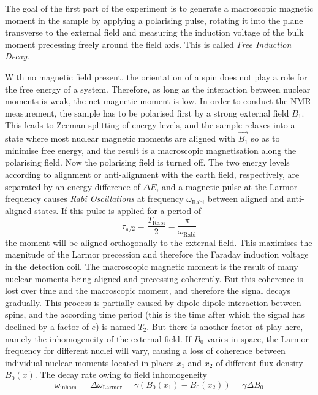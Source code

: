 \documentclass[
    parskip=half, 
    twoside=false,
    twocolumn=true,
    fontsize=11pt,
]{scrarticle}
\begin{document}
The goal of the first part of the experiment is to generate a macroscopic magnetic moment in the sample by applying a polarising pulse, rotating it into the plane transverse to the external field and measuring the induction voltage of the bulk moment precessing freely around the field axis. This is called \textit{Free Induction Decay}.

With no magnetic field present, the orientation of a spin does not play a role for the free energy of a system. Therefore, as long as the interaction between nuclear moments is weak, the net magnetic moment is low. In order to conduct the NMR measurement, the sample has to be polarised first by a strong external field $B_1$. This leads to Zeeman splitting of energy levels, and the sample relaxes into a state where most nuclear magnetic moments are aligned with $\vec{B_1}$ so as to minimise free energy, and the result is a macroscopic magnetisation along the polarising field. Now the polarising field is turned off. The two energy levels according to alignment or anti-alignment with the earth field, respectively, are separated by an energy difference of $\Delta E$, and a magnetic pulse at the Larmor frequency causes \textit{Rabi Oscillations} at frequency $\omega_\text{Rabi}$ between aligned and anti-aligned states. If this pulse is applied for a period of
\begin{equation}
 \tau_{\pi/2} = \frac{T_\text{Rabi}}{2} = \frac{\pi}{\omega_\text{Rabi}}
\end{equation}
the moment will be aligned orthogonally to the external field. This maximises the magnitude of the Larmor precession and therefore the Faraday induction voltage in the detection coil. The macroscopic magnetic moment is the result of many nuclear moments being aligned and precessing coherently. But this coherence is lost over time and the macroscopic moment, and therefore the signal decays gradually. This process is partially caused by dipole-dipole interaction between spins, and the according time period (this is the time after which the signal has declined by a factor of $e$) is named $T_2$. But there is another factor at play here, namely the inhomogeneity of the external field. If $B_0$ varies in space, the Larmor frequency for different nuclei will vary, causing a loss of coherence between individual nuclear moments located in places $x_1$ and $x_2$ of different flux density $B_0(x)$. The decay rate owing to field inhomogeneity
\begin{equation}
\label{eq:decoherence_inhom}
 \omega_\text{inhom.} = \Delta \omega_\text{Larmor} = \gamma (B_0(x_1) - B_0(x_2)) = \gamma \Delta B_0
\end{equation}
\end{document}
